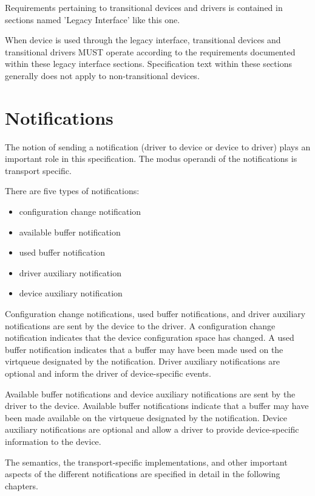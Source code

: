 Requirements pertaining to transitional devices and drivers
is contained in sections named 'Legacy Interface' like this one.

When device is used through the legacy interface, transitional
devices and transitional drivers MUST operate according to the
requirements documented within these legacy interface sections.
Specification text within these sections generally does not apply
to non-transitional devices.

\section{Notifications}\label{sec:Basic Facilities of a Virtio Device
/ Notifications}

The notion of sending a notification (driver to device or device
to driver) plays an important role in this specification. The
modus operandi of the notifications is transport specific.

There are five types of notifications:
\begin{itemize}
\item configuration change notification
\item available buffer notification
\item used buffer notification
\item driver auxiliary notification
\item device auxiliary notification
\end{itemize}

Configuration change notifications, used buffer notifications, and
driver auxiliary notifications are sent by the device to the driver.
A configuration change notification indicates that the device
configuration space has changed. A used buffer notification indicates
that a buffer may have been made used on the virtqueue designated by the
notification. Driver auxiliary notifications are optional and inform the
driver of device-specific events.

Available buffer notifications and device auxiliary notifications
are sent by the driver to the device. Available buffer notifications
indicate that a buffer may have been made available on the virtqueue
designated by the notification. Device auxiliary notifications are
optional and allow a driver to provide device-specific information to
the device.

The semantics, the transport-specific implementations, and other
important aspects of the different notifications are specified in detail
in the following chapters.

